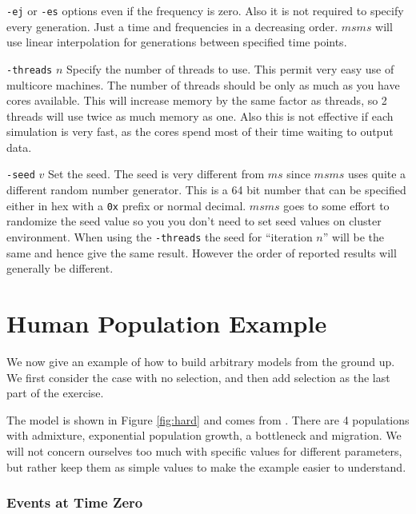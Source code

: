 \documentclass{article}
\begin{document}
\begin{eqlist*}
{\tt -ej} or {\tt -es} options even if the frequency is zero. Also it is not
required to specify every generation. Just a time and frequencies in a
decreasing order. $msms$ will use linear interpolation for generations between
specified time points. 
\item[{\tt -threads} $n$] Specify the number of threads to use. This permit
very easy use of multicore machines. The number of threads should be only as much as
you have cores available. This will increase memory by the same factor as
threads, so 2 threads will use twice as much memory as one. Also this is not
effective if each simulation is very fast, as the cores spend most of their time
waiting to output data. 
\item[{\tt -seed} $v$] Set the seed. The seed is very different from $ms$
since $msms$ uses quite a different random number generator. This is a
64 bit number that can be specified either in hex with a {\tt 0x} prefix or
normal decimal. $msms$ goes to some effort to randomize the seed value so you
you don't need to set seed values on cluster environment. When using the
{\tt -threads} the seed for ``iteration $n$'' will be the same and hence give
the same result. However the order of reported results will generally be
different. 
\end{eqlist*} 

\section{Human Population Example}

We now give an example of how to build arbitrary models from the ground up. We
first consider the case with no selection, and then add selection as the last part of
the exercise.

The model is shown in Figure \ref{fig:hard} and comes from
\citep{gutenkunst_inferringjoint_2009}. There are 4 populations with admixture,
exponential population growth, a bottleneck and migration. We will not
concern  ourselves too much with specific values for different parameters, but
rather keep  them as simple values to make the example easier to understand. 

\subsubsection*{Events at Time Zero}
\end{document}
